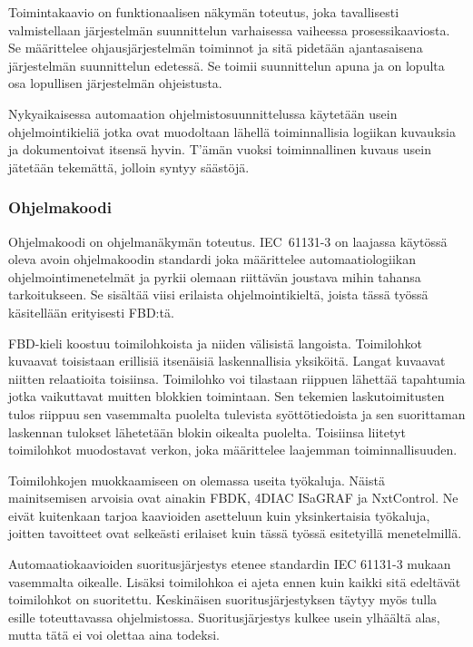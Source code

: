 \documentclass[finnish,12pt]{article}
\begin{document}
Toimintakaavio on funktionaalisen näkymän toteutus, joka tavallisesti valmistellaan järjestelmän suunnittelun varhaisessa vaiheessa prosessikaaviosta.
Se määrittelee ohjausjärjestelmän toiminnot ja sitä pidetään ajantasaisena järjestelmän suunnittelun edetessä.
Se toimii suunnittelun apuna ja on lopulta osa lopullisen järjestelmän ohjeistusta.

Nykyaikaisessa automaation ohjelmistosuunnittelussa käytetään usein ohjelmointikieliä jotka ovat muodoltaan lähellä toiminnallisia logiikan kuvauksia ja dokumentoivat itsensä hyvin.
T'ämän vuoksi toiminnallinen kuvaus usein jätetään tekemättä, jolloin syntyy säästöjä. \cite{RefWorks:41}

		\subsubsection{Ohjelmakoodi}

Ohjelmakoodi on ohjelmanäkymän toteutus.
IEC~61131-3 on laajassa käytössä oleva avoin ohjelmakoodin standardi joka määrittelee automaatiologiikan ohjelmointimenetelmät ja pyrkii olemaan riittävän joustava mihin tahansa tarkoitukseen. \cite{RefWorks:62}
Se sisältää viisi erilaista ohjelmointikieltä, joista tässä työssä käsitellään erityisesti FBD:tä.

FBD-kieli koostuu toimilohkoista ja niiden välisistä langoista.
Toimilohkot kuvaavat toisistaan erillisiä itsenäisiä laskennallisia yksiköitä.
Langat kuvaavat niitten relaatioita toisiinsa.
Toimilohko voi tilastaan riippuen lähettää tapahtumia jotka vaikuttavat muitten blokkien toimintaan.
Sen tekemien laskutoimitusten tulos riippuu sen vasemmalta puolelta tulevista syöttötiedoista ja sen suorittaman laskennan tulokset lähetetään blokin oikealta puolelta.
Toisiinsa liitetyt toimilohkot muodostavat verkon, joka määrittelee laajemman toiminnallisuuden. \cite{RefWorks:55}

Toimilohkojen muokkaamiseen on olemassa useita työkaluja.
Näistä mainitsemisen arvoisia ovat ainakin FBDK, 4DIAC ISaGRAF ja NxtControl.
Ne eivät kuitenkaan tarjoa kaavioiden asetteluun kuin yksinkertaisia työkaluja, joitten tavoitteet ovat selkeästi erilaiset kuin tässä työssä esitetyillä menetelmillä.

Automaatiokaavioiden suoritusjärjestys etenee standardin IEC 61131-3 mukaan vasemmalta oikealle.
Lisäksi toimilohkoa ei ajeta ennen kuin kaikki sitä edeltävät toimilohkot on suoritettu.
Keskinäisen suoritusjärjestyksen täytyy myös tulla esille toteuttavassa ohjelmistossa.
Suoritusjärjestys kulkee usein ylhäältä alas, mutta tätä ei voi olettaa aina todeksi. \cite{RefWorks:62}
\end{document}
